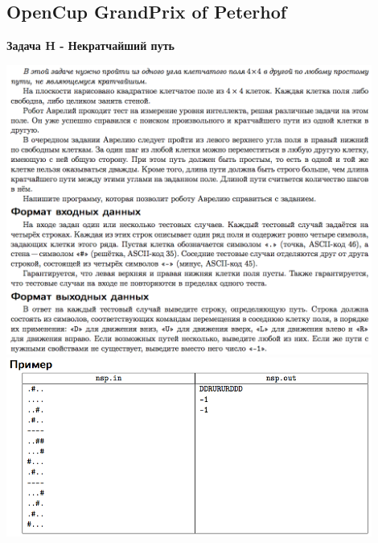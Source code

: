 \documentclass[a4paper,12pt]{article}
\begin{document}
%
%
\newpage
\subsection{OpenCup GrandPrix of Peterhof}

\textbf{{\large Задача H - Некратчайший путь}} \\
\begin{center}
\includegraphics[width=0.9\textwidth]{OC_Peterhof/OC_Peterhof_H1.png}\\ [1cm]
\includegraphics[width=0.9\textwidth]{OC_Peterhof/OC_Peterhof_H2.png}\\ [1cm]
\end{center}
\newpage
\end{document}
